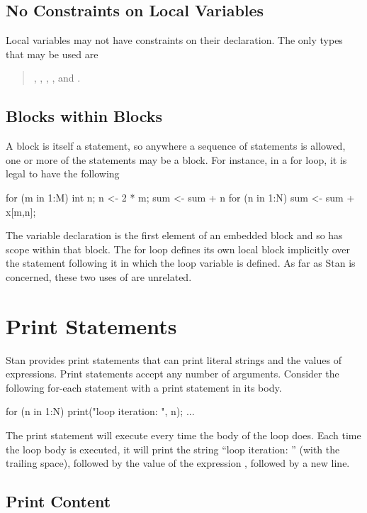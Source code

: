 \subsection{No Constraints on Local Variables}

Local variables may not have constraints on their declaration.  The
only types that may be used are
%
\begin{quote}
, ,
, , and .
\end{quote}

\subsection{Blocks within Blocks}

A block is itself a statement, so anywhere a sequence of statements is
allowed, one or more of the statements may be a block.  For instance,
in a for loop, it is legal to have the following
%
\begin{stancode}
for (m in 1:M) {
  {
     int n;
     n <- 2 * m;
     sum <- sum + n
  }
  for (n in 1:N)
    sum <- sum + x[m,n];
}
\end{stancode}
%
The variable declaration  is the first element of an
embedded block and so has scope within that block.  The for loop
defines its own local block implicitly over the statement following it
in which the loop variable is defined.  As far as Stan is concerned,
these two uses of  are unrelated.

\section{Print Statements}\label{print-statements.section}

Stan provides print statements that can print literal strings and the
values of expressions.  Print statements accept any number of
arguments.  Consider the following for-each statement with a print
statement in its body.
%
\begin{stancode}
for (n in 1:N) { print("loop iteration: ", n); ... }
\end{stancode}
%
The print statement will execute every time the body of the loop does.
Each time the loop body is executed, it will print the string ``loop iteration:
'' (with the trailing space), followed by the value of the expression
, followed by a new line.

\subsection{Print Content}

